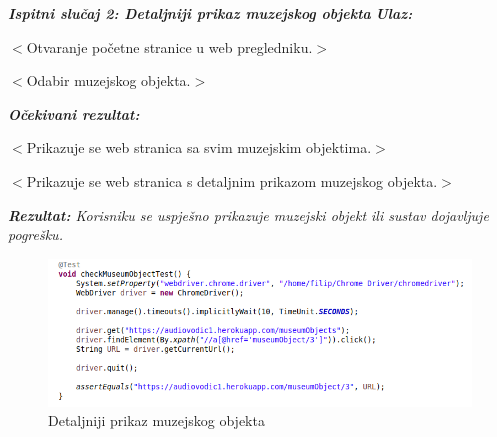 		 	 \textit{\textbf{Ispitni slučaj 2: Detaljniji prikaz muzejskog objekta}}
		 	 \newline
		 	 \textit{\textbf{Ulaz:}}
		 	 \begin{packed_enum}	
		 	 	\item $<$Otvaranje početne stranice u web pregledniku.$>$
		 	 	\item $<$Odabir muzejskog objekta.$>$
		 	 \end{packed_enum}
		 	 \textit{\textbf{Očekivani rezultat:}}
		 	 \begin{packed_enum}
		 	 	\item $<$Prikazuje se web stranica sa svim muzejskim objektima.$>$
		 	 	\item $<$Prikazuje se web stranica s detaljnim prikazom muzejskog objekta.$>$
		 	 \end{packed_enum}
		 	 \textit{\textbf{Rezultat:} Korisniku se uspješno prikazuje muzejski objekt ili sustav dojavljuje pogrešku.
		 	 \newline}
		 	 \begin{figure}[H]
		 	 	\includegraphics[scale=0.62]{slike/checkMuseumObjectTest.png}
		 	 	\centering
		 	 	\caption{Detaljniji prikaz muzejskog objekta}
		 	 	\label{fig:promjene}
		 	 \end{figure}
	 	 
